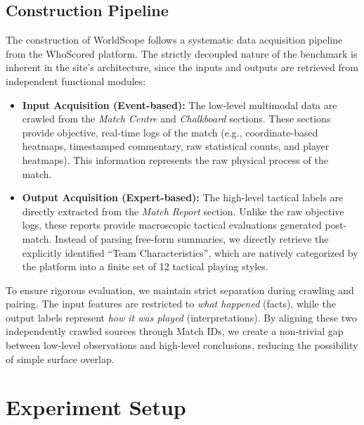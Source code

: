 \subsection{Construction Pipeline}
\label{app:construction_pipeline}

The construction of WorldScope follows a systematic data acquisition pipeline from the WhoScored platform. The strictly decoupled nature of the benchmark is inherent in the site's architecture, since the inputs and outputs are retrieved from independent functional modules:

\begin{itemize}[leftmargin=*]
    \item \textbf{Input Acquisition (Event-based):} The low-level multimodal data are crawled from the \textit{Match Centre} and \textit{Chalkboard} sections. These sections provide objective, real-time logs of the match (e.g., coordinate-based heatmaps, timestamped commentary, raw statistical counts, and player heatmaps). This information represents the raw physical process of the match.
    
    \item \textbf{Output Acquisition (Expert-based):} The high-level tactical labels are directly extracted from the \textit{Match Report} section. Unlike the raw objective logs, these reports provide macroscopic tactical evaluations generated post-match. Instead of parsing free-form summaries, we directly retrieve the explicitly identified ``Team Characteristics'', which are natively categorized by the platform into a finite set of 12 tactical playing styles.
\end{itemize}

To ensure rigorous evaluation, we maintain strict separation during crawling and pairing. The input features are restricted to \textit{what happened} (facts), while the output labels represent \textit{how it was played} (interpretations). By aligning these two independently crawled sources through Match IDs, we create a non-trivial gap between low-level observations and high-level conclusions, reducing the possibility of simple surface overlap.

\section{Experiment Setup}
\label{app:experiment_setup}

